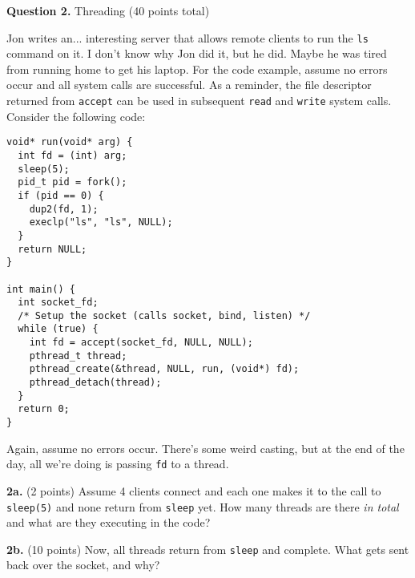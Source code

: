 \documentclass[12pt]{article}
\begin{document}
\newpage

\textbf{Question 2.} Threading (40 points total)

\vspace{1em}

Jon writes an... interesting server that allows remote clients to run the
\texttt{ls} command on it.
I don't know why Jon did it, but he did.
Maybe he was tired from running home to get his laptop.
For the code example, assume no errors occur and all system calls are
successful.
As a reminder, the file descriptor returned from \texttt{accept} can be used
in subsequent \texttt{read} and \texttt{write} system calls.
Consider the following code:

\vspace{1em}

\begin{lstlisting}
void* run(void* arg) {
  int fd = (int) arg;
  sleep(5);
  pid_t pid = fork();
  if (pid == 0) {
    dup2(fd, 1);
    execlp("ls", "ls", NULL);
  }
  return NULL;
}

int main() {
  int socket_fd;
  /* Setup the socket (calls socket, bind, listen) */
  while (true) {
    int fd = accept(socket_fd, NULL, NULL);
    pthread_t thread;
    pthread_create(&thread, NULL, run, (void*) fd);
    pthread_detach(thread);
  }
  return 0;
}
\end{lstlisting}

\vspace{1em}

Again, assume no errors occur.
There's some weird casting, but at the end of the day, all we're doing is
passing \texttt{fd} to a thread.

\vspace{1em}

\textbf{2a.} (2 points)
Assume 4 clients connect and each one makes it to the call to \texttt{sleep(5)}
and none return from \texttt{sleep} yet.
How many threads are there \textit{in total} and what are they executing in the
code?


\textbf{2b.} (10 points)
Now, all threads return from \texttt{sleep} and complete.
What gets sent back over the socket, and why?
\end{document}

